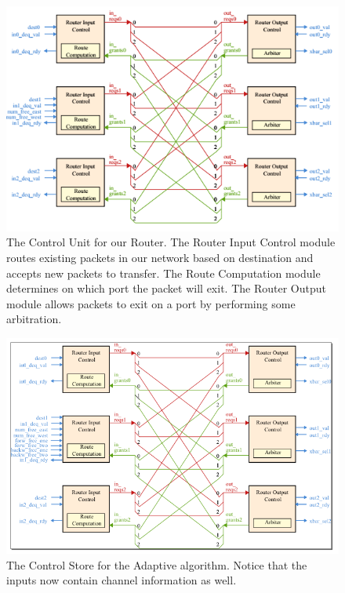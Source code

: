 \documentclass[10pt]{article}
\begin{document}
\begin{figure}[h]
	\centering
	\includegraphics[scale=0.7]{baselinectrl}
	\caption
	{
		The Control Unit for our Router.
		The Router Input Control module routes existing packets in our network 
		based on destination and accepts new packets to transfer.
		The Route Computation module determines on which port the packet will
		exit.
		The Router Output module allows packets to exit on a port by performing
		some arbitration. 
	}
	\label{fig:ctrl}
\end{figure}

\begin{figure}[h]
	\centering
	\includegraphics[scale=0.7]{altctrl}
	\caption{The Control Store for the Adaptive algorithm. 
			 Notice that the inputs now contain channel information as well.}
	\label{fig:altctrl}
\end{figure}
\end{document}
